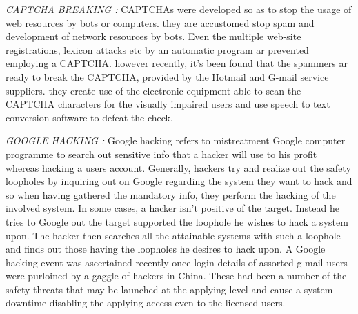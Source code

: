 \textit{CAPTCHA BREAKING :}
CAPTCHAs were developed so as to stop the usage of web resources by bots or computers. they are accustomed stop spam and development of network resources
by bots. Even the multiple web-site registrations, lexicon attacks etc by an automatic program ar prevented employing a CAPTCHA. however recently, it's been found that the spammers ar ready to break the CAPTCHA, provided by the Hotmail and G-mail service suppliers. they create use of the electronic equipment able to scan the CAPTCHA characters for the visually impaired users and use speech to text conversion software to defeat the check.

\textit{GOOGLE HACKING :}
Google hacking refers to mistreatment Google computer programme to search out sensitive info that a hacker will use to his profit whereas hacking a users account. Generally, hackers try and realize out the safety loopholes by inquiring out on Google regarding the system they want to hack and so when having gathered the mandatory info, they perform the hacking of the involved system.
In some cases, a hacker isn't positive of the target. Instead he tries to Google out the target supported the loophole he wishes to hack a system upon. The hacker then searches all the attainable systems with such a loophole and finds out those having the loopholes he desires to hack upon. A Google hacking event was ascertained
recently once login details of assorted g-mail users were purloined by a gaggle of
hackers in China. These had been a number of the safety threats that may be launched at the applying level and cause a system downtime disabling the applying access even to the licensed users.




